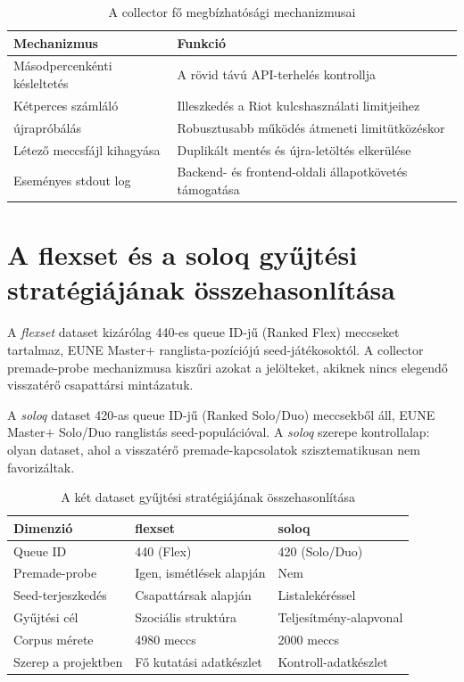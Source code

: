 \begin{table}[H]
\centering
\caption{A collector fő megbízhatósági mechanizmusai}
\begin{tabularx}{\textwidth}{>{\raggedright\arraybackslash}p{4.4cm}|X}
\toprule
\textbf{Mechanizmus} & \textbf{Funkció} \\
\midrule
Másodpercenkénti késleltetés & A rövid távú API-terhelés kontrollja \\
Kétperces számláló & Illeszkedés a Riot kulcshasználati limitjeihez \\
429 újrapróbálás & Robusztusabb működés átmeneti limitütközéskor \\
Létező meccsfájl kihagyása & Duplikált mentés és újra-letöltés elkerülése \\
Eseményes stdout log & Backend- és frontend-oldali állapotkövetés támogatása \\
\bottomrule
\end{tabularx}
\end{table}

\section{A flexset és a soloq gyűjtési stratégiájának összehasonlítása}

A \textit{flexset} dataset kizárólag 440-es queue ID-jű (Ranked Flex) meccseket tartalmaz, EUNE Master$+$ ranglista-pozíciójú seed-játékosoktól. A collector premade-probe mechanizmusa kiszűri azokat a jelölteket, akiknek nincs elegendő visszatérő csapattársi mintázatuk.

A \textit{soloq} dataset 420-as queue ID-jű (Ranked Solo/Duo) meccsekből áll, EUNE Master$+$ Solo/Duo ranglistás seed-populációval. A \textit{soloq} szerepe kontrollalap: olyan dataset, ahol a visszatérő premade-kapcsolatok szisztematikusan nem favorizáltak.

\begin{table}[H]
\centering
\caption{A két dataset gyűjtési stratégiájának összehasonlítása}
\begin{tabularx}{\textwidth}{>{\raggedright\arraybackslash}p{4.2cm}|X|X}
\toprule
\textbf{Dimenzió} & \textbf{flexset} & \textbf{soloq} \\
\midrule
Queue ID & 440 (Flex) & 420 (Solo/Duo) \\
Premade-probe & Igen, ismétlések alapján & Nem \\
Seed-terjeszkedés & Csapattársak alapján & Listalekéréssel \\
Gyűjtési cél & Szociális struktúra & Teljesítmény-alapvonal \\
Corpus mérete & 4980 meccs & 2000 meccs \\
Szerep a projektben & Fő kutatási adatkészlet & Kontroll-adatkészlet \\
\bottomrule
\end{tabularx}
\end{table}


